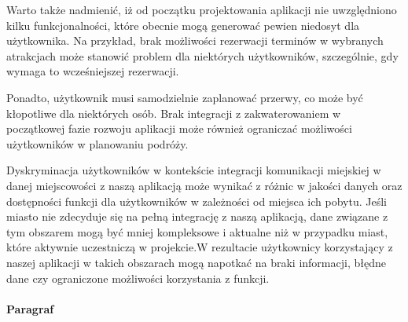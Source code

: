 \indent Warto także nadmienić, iż od początku projektowania aplikacji nie uwzględniono kilku funkcjonalności, które obecnie mogą generować pewien niedosyt dla użytkownika.
 Na przykład, brak możliwości rezerwacji terminów w wybranych atrakcjach może stanowić problem dla niektórych użytkowników, szczególnie, gdy wymaga to wcześniejszej rezerwacji. \newline

 \indent Ponadto, użytkownik musi samodzielnie zaplanować przerwy, co może być kłopotliwe dla niektórych osób. Brak integracji z zakwaterowaniem w początkowej fazie rozwoju aplikacji może również ograniczać możliwości użytkowników w planowaniu podróży.\newline

\indent Dyskryminacja użytkowników w kontekście integracji komunikacji miejskiej w danej miejscowości z naszą aplikacją może wynikać z różnic w jakości danych oraz dostępności funkcji dla użytkowników w zależności od miejsca ich pobytu.
Jeśli miasto nie zdecyduje się na pełną integrację z naszą aplikacją, dane związane z tym obszarem mogą być mniej kompleksowe i aktualne niż w przypadku miast, które aktywnie uczestniczą w projekcie.\newline W rezultacie użytkownicy korzystający z naszej aplikacji w takich obszarach mogą napotkać na braki informacji, błędne dane czy ograniczone możliwości korzystania z funkcji.

\paragraph{Paragraf}

